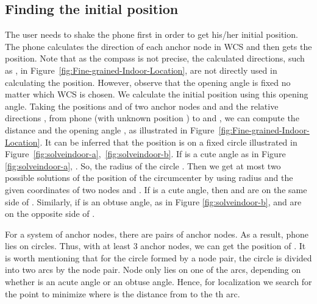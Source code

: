 \documentclass[]{sig-alternate-10pt}
\newcommand{\MYCUT}[1]{{ }}
\begin{document}
\subsection{Finding the initial position}
The user needs to shake the phone first in order to get his/her initial
position.
The phone calculates the direction of each
anchor node in WCS and then gets the position.
Note that as the compass is not precise, the calculated directions,
 such as ,  in
 Figure~\ref{fig:Fine-grained-Indoor-Location}, are not directly  used in
 calculating the  position.
However,  observe that the opening angle
  is fixed no matter which WCS is chosen.
We calculate the initial position using this opening angle.
\MYCUT{\begin{figure}[htpb]
    \begin{center}
\texttt{[image: solveindoor]}
    \end{center}
\caption{Getting the radius  and the center of circle  by using
   and .  }\label{fig:solveindoor}
\end{figure}
}Taking the positions  and  of two anchor nodes
  and  and the relative directions ,  from phone (with unknown
 position ) to  and , we can compute the distance
  and the opening angle , as illustrated in Figure~\ref{fig:Fine-grained-Indoor-Location}.
It can be inferred that the position  is on a fixed circle
 illustrated in Figure~\ref{fig:solveindoor-a},~\ref{fig:solveindoor-b}.
If  is a cute angle as in Figure \ref{fig:solveindoor-a},
 .
So, the radius of the circle .
Then we get at most two possible solutions of the position
 of the circumcenter  by using radius  and the given coordinates
 of   two nodes  and .
If  is a cute angle, then  and  are on the same side
 of .
Similarly, if  is an obtuse angle, as in Figure \ref{fig:solveindoor-b},
  and  are on the opposite side of .


For a system of  anchor nodes, there are   pairs
of anchor nodes.
As a result, phone  lies on  circles.
Thus, with at least 3 anchor nodes, we can get the position of .
It is worth mentioning that for the circle formed by a node pair, the
circle is divided into two arcs by the node pair.
Node  only lies on one of the arcs,
 depending on whether  is an acute angle or an obtuse angle.
Hence, for localization we search for the point 
 to minimize   where  is the distance
 from  to the th arc.
\end{document}
